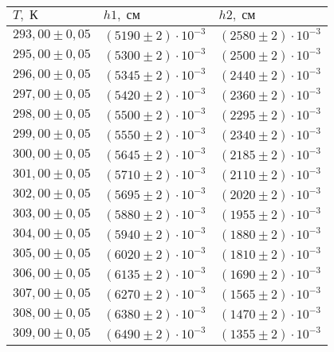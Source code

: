 \begin{tabular}{|l|l|l|}
\hline
$T,\;\text{К}$ & $h1,\;\text{см}$ & $h2,\;\text{см}$\\\hline
$293{,}00 \pm 0{,}05$ & $\left(5190 \pm 2\right)\cdot 10^{-3}$ & $\left(2580 \pm 2\right)\cdot 10^{-3}$\\\hline
$295{,}00 \pm 0{,}05$ & $\left(5300 \pm 2\right)\cdot 10^{-3}$ & $\left(2500 \pm 2\right)\cdot 10^{-3}$\\\hline
$296{,}00 \pm 0{,}05$ & $\left(5345 \pm 2\right)\cdot 10^{-3}$ & $\left(2440 \pm 2\right)\cdot 10^{-3}$\\\hline
$297{,}00 \pm 0{,}05$ & $\left(5420 \pm 2\right)\cdot 10^{-3}$ & $\left(2360 \pm 2\right)\cdot 10^{-3}$\\\hline
$298{,}00 \pm 0{,}05$ & $\left(5500 \pm 2\right)\cdot 10^{-3}$ & $\left(2295 \pm 2\right)\cdot 10^{-3}$\\\hline
$299{,}00 \pm 0{,}05$ & $\left(5550 \pm 2\right)\cdot 10^{-3}$ & $\left(2340 \pm 2\right)\cdot 10^{-3}$\\\hline
$300{,}00 \pm 0{,}05$ & $\left(5645 \pm 2\right)\cdot 10^{-3}$ & $\left(2185 \pm 2\right)\cdot 10^{-3}$\\\hline
$301{,}00 \pm 0{,}05$ & $\left(5710 \pm 2\right)\cdot 10^{-3}$ & $\left(2110 \pm 2\right)\cdot 10^{-3}$\\\hline
$302{,}00 \pm 0{,}05$ & $\left(5695 \pm 2\right)\cdot 10^{-3}$ & $\left(2020 \pm 2\right)\cdot 10^{-3}$\\\hline
$303{,}00 \pm 0{,}05$ & $\left(5880 \pm 2\right)\cdot 10^{-3}$ & $\left(1955 \pm 2\right)\cdot 10^{-3}$\\\hline
$304{,}00 \pm 0{,}05$ & $\left(5940 \pm 2\right)\cdot 10^{-3}$ & $\left(1880 \pm 2\right)\cdot 10^{-3}$\\\hline
$305{,}00 \pm 0{,}05$ & $\left(6020 \pm 2\right)\cdot 10^{-3}$ & $\left(1810 \pm 2\right)\cdot 10^{-3}$\\\hline
$306{,}00 \pm 0{,}05$ & $\left(6135 \pm 2\right)\cdot 10^{-3}$ & $\left(1690 \pm 2\right)\cdot 10^{-3}$\\\hline
$307{,}00 \pm 0{,}05$ & $\left(6270 \pm 2\right)\cdot 10^{-3}$ & $\left(1565 \pm 2\right)\cdot 10^{-3}$\\\hline
$308{,}00 \pm 0{,}05$ & $\left(6380 \pm 2\right)\cdot 10^{-3}$ & $\left(1470 \pm 2\right)\cdot 10^{-3}$\\\hline
$309{,}00 \pm 0{,}05$ & $\left(6490 \pm 2\right)\cdot 10^{-3}$ & $\left(1355 \pm 2\right)\cdot 10^{-3}$\\\hline

\end{tabular}
